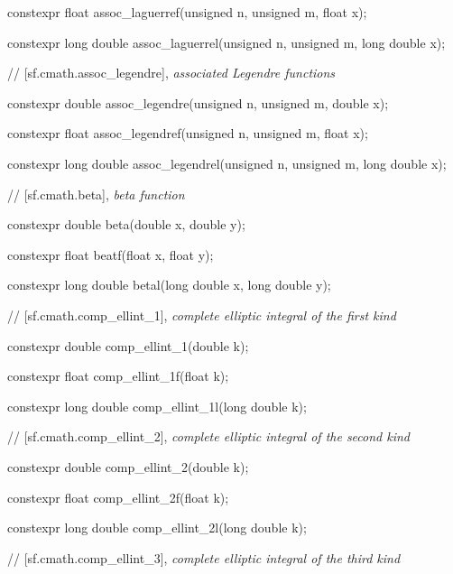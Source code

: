 \documentclass[prd,twocolumn,amsmath,amssymb,nofootinbib,eqsecnum]{revtex4-1}
\newcommand{\highlight}[1]{{\color{red} #1}}
\newcommand{\bigund}{{\Huge{\_}}}
\begin{document}
{\highlight{constexpr} float assoc\_laguerref(unsigned n, unsigned m, float x);
	
\highlight{constexpr} long double assoc\_laguerrel(unsigned n, unsigned m, long double x);

\vspace{2ex}

// [sf.cmath.assoc{\bigund}legendre], {\it associated Legendre functions}

\vspace{2ex}

\highlight{constexpr} double assoc\_legendre(unsigned n, unsigned m, double x);
	
\highlight{constexpr} float assoc\_legendref(unsigned n, unsigned m, float x);
	
\highlight{constexpr} long double assoc\_legendrel(unsigned n, unsigned m, long double x);

\vspace{2ex}

// [sf.cmath.beta], {\it beta function}

\vspace{2ex}

\highlight{constexpr} double beta(double x, double y);
	
\highlight{constexpr} float beatf(float x, float y);
	
\highlight{constexpr} long double betal(long double x, long double y);

\vspace{2ex}
// [sf.cmath.comp{\bigund}ellint{\bigund}1], {\it complete elliptic integral of the first kind}
\vspace{2ex}

\highlight{constexpr} double comp\_ellint\_1(double k);
	
\highlight{constexpr} float comp\_ellint\_1f(float k);
	
\highlight{constexpr} long double comp\_ellint\_1l(long double k);

\vspace{2ex}
// [sf.cmath.comp{\bigund}ellint{\bigund}2], {\it complete elliptic integral of the second kind}
\vspace{2ex}

\highlight{constexpr} double comp\_ellint\_2(double k);
	
\highlight{constexpr} float comp\_ellint\_2f(float k);
	
\highlight{constexpr} long double comp\_ellint\_2l(long double k);

\vspace{2ex}
// [sf.cmath.comp{\bigund}ellint{\bigund}3], {\it complete elliptic integral of the third kind}
\vspace{2ex}

}
\end{document}
